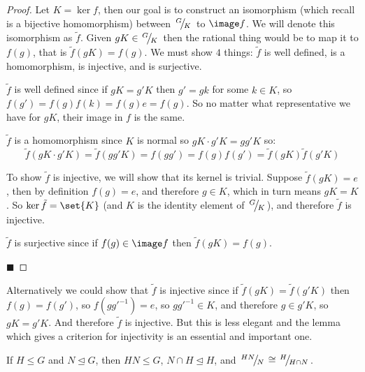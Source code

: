 \documentclass[10pt]{article}
\def\slfrac#1#2{\left.{}^{#1}\mkern-4mu\middle/\mkern-3mu{}_{#2}\right.}
\let\normalsub=\trianglelefteq
\begin{document}
\begin{proof}

    Let $K=\ker f$, then our goal is to construct an isomorphism (which recall is a bijective homomorphism) between $\slfrac GK$ to $\image f$.
    We will denote this isomorphism as $\tilde f$.
    Given $gK\in\slfrac GK$ then the rational thing would be to map it to $f(g)$, that is $\tilde f(gK)=f(g)$.
    We must show $4$ things: $\tilde f$ is well defined, is a homomorphism, is injective, and is surjective.

    $\tilde f$ is well defined since if $gK=g'K$ then $g'=gk$ for some $k\in K$, so $f(g')=f(g)f(k)=f(g)e=f(g)$.
    So no matter what representative we have for $gK$, their image in $f$ is the same.

    $\tilde f$ is a homomorphism since $K$ is normal so $gK\cdot g'K=gg'K$ so:
    \[ \tilde f(gK\cdot g'K) = \tilde f(gg'K) = f(gg') = f(g)f(g') = \tilde f(gK)\tilde f(g'K) \]

    To show $\tilde f$ is injective, we will show that its kernel is trivial.
    Suppose $\tilde f(gK)=e$, then by definition $f(g)=e$, and therefore $g\in K$, which in turn means $gK=K$.
    So $\ker\tilde f=\set{K}$ (and $K$ is the identity element of $\slfrac GK$), and therefore $\tilde f$ is injective.

    $\tilde f$ is surjective since if $f(g)\in\image f$ then $\tilde f(gK)=f(g)$.

    \hfill$\blacksquare$

\end{proof}

Alternatively we could show that $\tilde f$ is injective since if $\tilde f(gK)=\tilde f(g'K)$ then $f(g)=f(g')$, so $f(gg'^{-1})=e$, so $gg'^{-1}\in K$, and therefore $g\in g'K$, so $gK=g'K$.
And therefore $\tilde f$ is injective.
But this is less elegant and the lemma which gives a criterion for injectivity is an essential and important one.

\begin{thrm*}

    If $H\leq G$ and $N\normalsub G$, then $HN\leq G$, $N\cap H\normalsub H$, and $\slfrac{HN}N\cong\slfrac H{H\cap N}$.

\end{thrm*}
\end{document}
